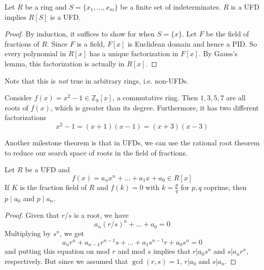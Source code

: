   \begin{theorem}
    Let $R$ be a ring and $S = \{x_1, \ldots, x_m\}$ be a finite set of indeterminates. $R$ is a UFD implies $R[S]$ is a UFD. 
  \end{theorem}
  \begin{proof}
    By induction, it suffices to show for when $S = \{x\}$. Let $F$ be the field of fractions of $R$. Since $F$ is a field, $F[x]$ is Euclidean domain and hence a PID. So every polynomial in $R[x]$ has a unique factorization in $F[x]$. By Gauss's lemma, this factorization is actually in $R[x]$. 
  \end{proof}

  Note that this is \textit{not} true in arbitrary rings, i.e. non-UFDs. 

  \begin{example}
    Consider $f(x) = x^2 - 1 \in \mathbb{Z}_8 [x]$, a commutative ring. Then $1, 3, 5, 7$ are all roots of $f(x)$, which is greater than its degree. Furthermore, it has two different factorizations 
    \begin{equation}
      x^2 - 1 = (x + 1)(x - 1) = (x + 3)(x - 3)
    \end{equation}
  \end{example} 

  Another milestone theorem is that in UFDs, we can use the rational root theorem to reduce our search space of roots in the field of fractions.  

  \begin{theorem}
    Let $R$ be a UFD and 
    \begin{equation}
      f(x) = a_n x^n + \ldots + a_1 x + a_0 \in R[x] 
    \end{equation}
    If $K$ is the fraction field of $R$ and $f(k) = 0$ with $k = \frac{p}{q}$ for $p, q$ coprime, then $p \mid a_0$ and $p \mid a_n$. 
  \end{theorem}
  \begin{proof}
    Given that $r/s$ is a root, we have 
    \begin{equation}
      a_n (r/s)^n + \ldots + a_0 = 0
    \end{equation}
    Multiplying by $s^n$, we get 
    \begin{equation}
      a_n r^n + a_{n-1} r^{n-1} s + \ldots + a_1 s^{n-1} r + a_0 s^n = 0
    \end{equation}
    and putting this equation on mod $r$ and mod $s$ implies that $r | a_0 s^n$ and $s | a_n r^n$, respectively. But since we assumed that $\gcd (r, s) = 1$, $r | a_0$ and $s | a_n$. 
  \end{proof}

